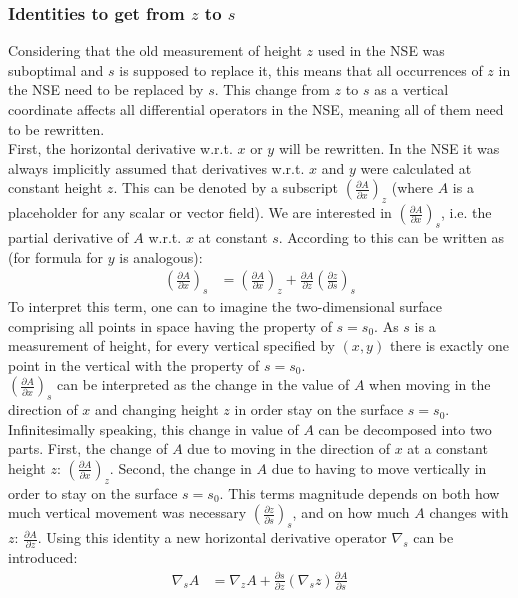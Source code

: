 \subsubsection{Identities to get from $z$ to $s$}
Considering that the old measurement of height $z$ used in the NSE was suboptimal and $s$ is supposed to replace it, this means that all occurrences of $z$ in the NSE need to be replaced by $s$.
This change from $z$ to $s$ as a vertical coordinate affects all differential operators in the NSE, meaning all of them need to be rewritten.
\\
First, the horizontal derivative w.r.t. $x$ or $y$ will be rewritten.
In the NSE it was always implicitly assumed that derivatives w.r.t. $x$ and $y$ were calculated at constant height $z$.
This can be denoted by a subscript $\left(\frac{\partial A}{\partial x}\right)_z$ (where $A$ is a placeholder for any scalar or vector field).
We are interested in $\left(\frac{\partial A}{\partial x}\right)_s$, i.e. the partial derivative of $A$ w.r.t. $x$ at constant $s$.
According to \cite{kasahara1974various} this can be written as (for formula for $y$ is analogous):
\begin{align*}
\left(\frac{\partial A}{\partial x}\right)_s &= \left( \frac{\partial A}{\partial x}\right)_z + \frac{\partial A}{\partial z}\left(\frac{\partial z}{\partial s}\right)_s
\end{align*}
To interpret this term, one can to imagine the two-dimensional surface comprising all points in space having the property of $s=s_0$.
As $s$ is a measurement of height, for every vertical specified by $(x,y)$ there is exactly one point in the vertical with the property of $s=s_0$.
\\
$\left(\frac{\partial A}{\partial x}\right)_s$ can be interpreted as the change in the value of $A$ when moving in the direction of $x$ and changing height $z$ in order stay on the surface $s=s_0$.
Infinitesimally speaking, this change in value of $A$ can be decomposed into two parts.
First, the change of $A$ due to moving in the direction of $x$ at a constant height $z$: $\left( \frac{\partial A}{\partial x}\right)_z$.
Second, the change in $A$ due to having to move vertically in order to stay on the surface $s=s_0$.
This terms magnitude depends on both how much vertical movement was necessary $\left(\frac{\partial z}{\partial s}\right)_s$, and on how much $A$ changes with $z$: $\frac{\partial A}{\partial z}$. 
Using this identity a new horizontal derivative operator $\nabla_s$ can be introduced:
\begin{align}
\nabla _s A &= \nabla _z A+\frac{\partial s}{\partial z}(\nabla _sz)\frac{\partial A}{\partial s}\label{id_h_diff}
\end{align}

